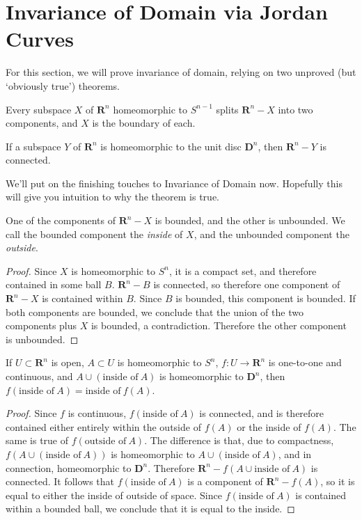 \section{Invariance of Domain via Jordan Curves}

For this section, we will prove invariance of domain, relying on two unproved (but `obviously true') theorems.

\begin{theorem}
    Every subspace $X$ of $\mathbf{R}^n$ homeomorphic to $S^{n-1}$ splits $\mathbf{R}^n - X$ into two components, and $X$ is the boundary of each.
\end{theorem}

\begin{theorem}
    If a subspace $Y$ of $\mathbf{R}^n$ is homeomorphic to the unit disc $\mathbf{D}^n$, then $\mathbf{R}^n - Y$ is connected.
\end{theorem}

We'll put on the finishing touches to Invariance of Domain now. Hopefully this will give you intuition to why the theorem is true.

\begin{lemma}
    One of the components of $\mathbf{R}^n - X$ is bounded, and the other is unbounded. We call the bounded component the \emph{inside} of $X$, and the unbounded component the \emph{outside}.
\end{lemma}
\begin{proof}
    Since $X$ is homeomorphic to $S^n$, it is a compact set, and therefore contained in some ball $B$. $\mathbf{R}^n - B$ is connected, so therefore one component of $\mathbf{R}^n - X$ is contained within $B$. Since $B$ is bounded, this component is bounded. If both components are bounded, we conclude that the union of the two components plus $X$ is bounded, a contradiction. Therefore the other component is unbounded.
\end{proof}

\begin{lemma}
    If $U \subset \mathbf{R}^n$ is open, $A \subset U$ is homeomorphic to $S^n$, $f:U \to \mathbf{R}^n$ is one-to-one and continuous, and $A \cup (\text{inside of}\ A)$ is homeomorphic to $\mathbf{D}^n$, then $f(\text{inside of}\ A) = \text{inside of}\ f(A)$.
\end{lemma}
\begin{proof}
    Since $f$ is continuous, $f(\text{inside of}\ A)$ is connected, and is therefore contained either entirely within the outside of $f(A)$ or the inside of $f(A)$. The same is true of $f(\text{outside of}\ A)$. The difference is that, due to compactness, $f(A \cup (\text{inside of}\ A))$ is homeomorphic to $A \cup (\text{inside of}\ A)$, and in connection, homeomorphic to $\mathbf{D}^n$. Therefore $\mathbf{R}^n - f(A \cup \text{inside of}\ A)$ is connected. It follows that $f(\text{inside of}\ A)$ is a component of $\mathbf{R}^n - f(A)$, so it is equal to either the inside of outside of space. Since $f(\text{inside of}\ A)$ is contained within a bounded ball, we conclude that it is equal to the inside.
\end{proof}

